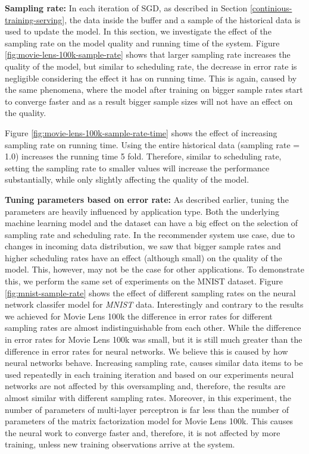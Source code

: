 \documentclass{vldb}
\begin{document}
\textbf{Sampling rate:} In each iteration of SGD, as described in Section \ref{continious-training-serving}, the data inside the buffer and a sample of the historical data is used to update the model.
In this section, we investigate the effect of the sampling rate on the model quality and running time of the system.
Figure \ref{fig:movie-lens-100k-sample-rate} shows that larger sampling rate increases the quality of the model, but similar to scheduling rate, the decrease in error rate is negligible considering the effect it has on running time. 
This is again, caused by the same phenomena, where the model after training on bigger sample rates start to converge faster and as a result bigger sample sizes will not have an effect on the quality.
 
Figure \ref{fig:movie-lens-100k-sample-rate-time} shows the effect of increasing sampling rate on running time.
Using the entire historical data (sampling rate = 1.0) increases the running time 5 fold. 
Therefore, similar to scheduling rate, setting the sampling rate to smaller values will increase the performance substantially, while only slightly affecting the quality of the model.

\textbf{Tuning parameters based on error rate:} As described earlier, tuning the parameters are heavily influenced by application type.
Both the underlying machine learning model and the dataset can have a big effect on the selection of sampling rate and scheduling rate.
In the recommender system use case, due to changes in incoming data distribution, we saw that bigger sample rates and higher scheduling rates have an effect (although small) on the quality of the model.
This, however, may not be the case for other applications.
To demonstrate this, we perform the same set of experiments on the MNIST dataset.
Figure \ref{fig:mnist-sample-rate} shows the effect of different sampling rates on the neural network classifer model for \textit{MNIST} data.
Interestingly and contrary to the results we achieved for Movie Lens 100k the difference in error rates for different sampling rates are almost indistinguishable from each other.
While the difference in error rates for Movie Lens 100k was small, but it is still much greater than the difference in error rates for neural networks.
We believe this is caused by how neural networks behave.
Increasing sampling rate, causes similar data items to be used repeatedly in each training iteration and based on our experiments neural networks are not affected by this oversampling and, therefore, the results are almost similar with different sampling rates.
Moreover, in this experiment, the number of parameters of multi-layer perceptron is far less than the number of parameters of the matrix factorization model for Movie Lens 100k.
This causes the neural work to converge faster and, therefore, it is not affected by more training, unless new training observations arrive at the system.
\end{document}
